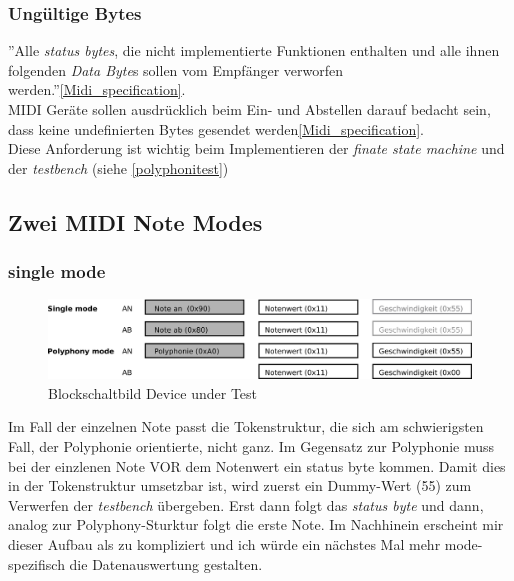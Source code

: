 \subsubsection*{Ungültige Bytes}
''Alle \textit{status bytes}, die nicht implementierte Funktionen enthalten und alle ihnen folgenden \textit{Data Byte}s sollen vom Empfänger verworfen werden.''\ref{Midi_specification}.\\ MIDI Geräte sollen ausdrücklich beim Ein- und Abstellen darauf bedacht sein, dass keine undefinierten Bytes gesendet werden\ref{Midi_specification}.\\
Diese Anforderung ist wichtig beim Implementieren der \textit{finate state machine} und der \textit{testbench} (siehe \ref{polyphonitest}) \\

\subsection{Zwei MIDI Note Modes}\label{note_modes}
\subsubsection{single mode}
\begin{figure}[H]
	\centering
	\includegraphics[width=1\textwidth]{images/midi_interface/MIDI_Spezifikation.png}
	\caption{Blockschaltbild Device under Test}
	\label{fig.testbench_single_Mode}
\end{figure}

Im Fall der einzelnen Note passt die Tokenstruktur, die sich am schwierigsten Fall, der Polyphonie orientierte, nicht ganz. Im Gegensatz zur Polyphonie muss bei der einzlenen Note VOR dem Notenwert ein status byte kommen. Damit dies in der Tokenstruktur umsetzbar ist, wird zuerst ein Dummy-Wert (55) zum Verwerfen der \textit{testbench} übergeben. Erst dann folgt das \textit{status byte} und dann, analog zur Polyphony-Sturktur folgt die erste Note. Im Nachhinein erscheint mir dieser Aufbau als zu kompliziert und ich würde ein nächstes Mal mehr mode-spezifisch die Datenauswertung gestalten.


